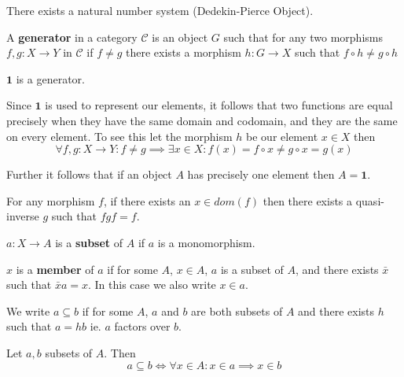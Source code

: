 \begin{axiom}
There exists a natural number system (Dedekin-Pierce Object).
\end{axiom}

\begin{definition}
A \textbf{generator} in a category $\mathcal{C}$ is an object $G$ such that for any two morphisms $f,g: X \longrightarrow Y$ in $\mathcal{C}$ if $f \neq g$ there exists a morphism $h: G \longrightarrow X$ such that $f \circ h \neq g \circ h$
\end{definition}

\begin{axiom}
$\mathbf{1}$ is a generator.
\end{axiom}

\begin{remark}
Since $\mathbf{1}$ is used to represent our elements, it follows that two functions are equal precisely when they have the same domain and codomain, and they are the same on every element. To see this let the morphism $h$ be our element $x \in X$ then
\begin{equation*}
\forall f,g: X \longrightarrow Y: f \neq g \implies \exists x \in X : f(x) = f \circ x \neq g \circ x = g(x)
\end{equation*}

Further it follows that if an object $A$ has precisely one element then $A = \mathbf{1}$.
\end{remark}

\begin{axiom}[AC]
For any morphism $f$, if there exists an $x \in dom(f)$ then there exists a quasi-inverse $g$ such that $fgf = f$.
\end{axiom}

\begin{definition}
$a:X \longrightarrow A$ is a \textbf{subset} of $A$ if $a$ is a monomorphism.

$x$ is a \textbf{member} of $a$ if for some $A$, $x \in A$, $a$ is a subset of $A$, and there exists $\bar{x}$ such that $\bar{x}a = x$. In this case we also write $x \in a$.

We write $a \subseteq b$ if for some $A$, $a$ and $b$ are both subsets of $A$ and there exists $h$ such that $a = hb$ ie. $a$ factors over $b$.
\end{definition}

\begin{theorem}
Let $a, b$ subsets of $A$. Then
\begin{equation}
a \subseteq b \iff \forall x \in A: x \in a \implies x \in b
\end{equation}
\end{theorem}

